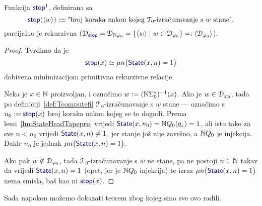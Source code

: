 \begin{lema}[{name=[parcijalna rekurzivnost brojenja koraka do zaustavljanja]}]\label{lm:stopprek}
Funkcija $\f{stop}^1$, definirana sa
\begin{equation}
    \f{stop}(\kr w):\simeq\text{"broj koraka nakon kojeg $\mathcal T_0$-izračunavanje s $w$ stane",}
\end{equation}
    parcijalno je rekurzivna ($\dom{\f{stop}}=\dom{\N\varphi_0}=\{\kr w\mid w\in\dom{\varphi_0}\}=:\kr{\dom{\varphi_0}}$).
\end{lema}
\begin{proof}
Tvrdimo da je
\begin{equation}\label{eq:stopdef}
    \f{stop}(x)\simeq\mu n\bigl(\f{State}(x,n)=1\bigr)
\end{equation}
dobivena minimizacijom primitivno rekurzivne relacije.

Neka je $x\in{\mathbb N}$ proizvoljan, i označimo $w:=({\mathbb N}\Sigma_0^*)^{-1}(x)$. Ako je $w\in\mathcal D_{\varphi_0}$, tada po definiciji~\ref{def:Tcomputefi} $\mathcal T_0$-izračunavanje s $w$ stane --- označimo s $n_0:=\f{stop}(x)$ broj koraka nakon kojeg se to dogodi. Prema lemi~\ref{lm:StateHeadTapeprn} vrijedi $\f{State}(x,n_0)=\N Q_0(q_z)=1$, ali isto tako za sve $n<n_0$ vrijedi $\f{State}(x,n)\ne 1$, jer stanje još nije završno, a ${\mathbb N} Q_0$ je injekcija. Dakle $n_0$ je jednak $\mu n\bigl(\f{State}(x,n)=1\bigr)$.

Ako pak $w\notin\mathcal D_{\varphi_0}$, tada $\mathcal T_0$-izračunavanje s $w$ ne stane, pa ne postoji $n\in{\mathbb N}$ takav da vrijedi $\f{State}(x,n)=1$ (opet, jer je ${\mathbb N} Q_0$ injekcija) te izraz $\mu n\bigl(\f{State}(x,n)=1\bigr)$ nema smisla, baš kao ni $\f{stop}(x)$.
\end{proof}

Sada napokon možemo dokazati teorem zbog kojeg smo sve ovo radili.

